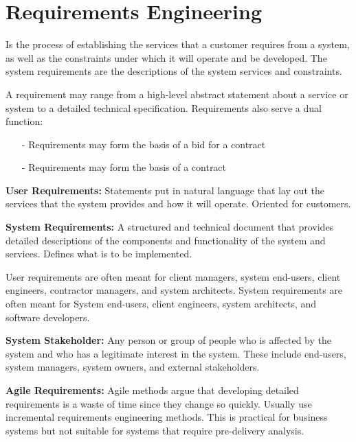 \documentclass[12pt]{article}
\begin{document}
\setlength{\parskip}{0.1in}
\setlength{\parindent}{0in}

\setlength{\headheight}{0.5in}
\pagestyle{fancy}

\section*{Requirements Engineering}

    Is the process of establishing the services that a customer requires from a system, as well as the constraints under which it will operate and be developed. The system requirements are the descriptions of the system services and constraints.

    A requirement may range from a high-level abstract statement about a service or system to a detailed technical specification. Requirements also serve a dual function:

    \begin{itemize}
        \item [-] Requirements may form the basis of a bid for a contract
        \item [-] Requirements may form the basis of a contract
    \end{itemize}

    \textbf{User Requirements:} Statements put in natural language that lay out the services that the system provides and how it will operate. Oriented for customers.

    \textbf{System Requirements:} A structured and technical document that provides detailed descriptions of the components and functionality of the system and services. Defines what is to be implemented.

    User requirements are often meant for client managers, system end-users, client engineers, contractor managers, and system architects. System requirements are often meant for System end-users, client engineers, system architects, and software developers.

    \textbf{System Stakeholder:} Any person or group of people who is affected by the system and who has a legitimate interest in the system. These include end-users, system managers, system owners, and external stakeholders.

    \textbf{Agile Requirements:} Agile methods argue that developing detailed requirements is a waste of time since they change so quickly. Usually use incremental requirements engineering methods. This is practical for business systems but not suitable for systems that require pre-delivery analysis.
\end{document}
